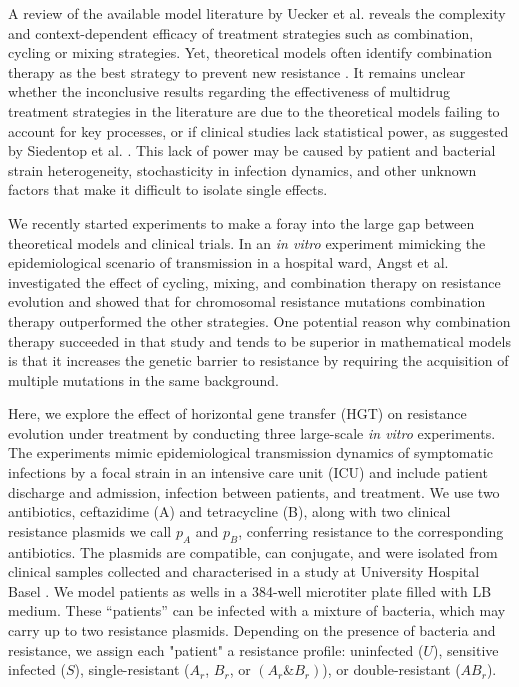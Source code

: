 \documentclass[9pt,twocolumn,twoside,lineno]{pnas-new}
\begin{document}
    A review of the available model literature by Uecker et al. \cite{Uecker2021} reveals the complexity and context-dependent efficacy of treatment strategies such as combination, cycling or mixing strategies.
    Yet, theoretical models often identify combination therapy as the best strategy to prevent new resistance \cite{Bonhoeffer1997, Tepekule2017}.
    It remains unclear whether the inconclusive results regarding the effectiveness of multidrug treatment strategies in the literature are due to the theoretical models failing to account for key processes, or if clinical studies lack statistical power, as suggested by Siedentop et al. \cite{siedentop_metaanalysis_2024}.
    This lack of power may be caused by patient and bacterial strain heterogeneity, stochasticity in infection dynamics, and other unknown factors that make it difficult to isolate single effects.
    
    We recently started experiments to make a foray into the large gap between theoretical models and clinical trials.
    In an {\it in vitro} experiment mimicking the epidemiological scenario of transmission in a hospital ward, Angst et al. \cite{Angst2021} investigated the effect of cycling, mixing, and combination therapy on resistance evolution and showed that for chromosomal resistance mutations combination therapy outperformed the other strategies.
    One potential reason why combination therapy succeeded in that study and tends to be superior in mathematical models is that it increases the genetic barrier to resistance by requiring the acquisition of multiple mutations in the same background.
    
    Here, we explore the effect of horizontal gene transfer (HGT) on resistance evolution under treatment by conducting three large-scale \textit{in vitro} experiments. 
    The experiments mimic epidemiological transmission dynamics of symptomatic infections by a focal strain in an intensive care unit (ICU) and include patient discharge and admission, infection between patients, and treatment.
    We use two antibiotics, ceftazidime (A) and tetracycline (B), along with two clinical resistance plasmids \cite{Huisman2022} we call $p_A$ and $p_B$, conferring resistance to the corresponding antibiotics.
    The plasmids are compatible, can conjugate, and were isolated from clinical samples collected and characterised in a study at University Hospital Basel \cite{Sutter2016}.
    We model patients as wells in a 384-well microtiter plate filled with LB medium. 
    These ``patients'' can be infected with a mixture of bacteria, which may carry up to two resistance plasmids. 
    Depending on the presence of bacteria and resistance, we assign each "patient" a resistance profile: uninfected ($U$), sensitive infected ($S$), single-resistant ($A_r$, $B_r$, or $(A_r\&B_r)$), or double-resistant ($AB_r$).
    
\end{document}
